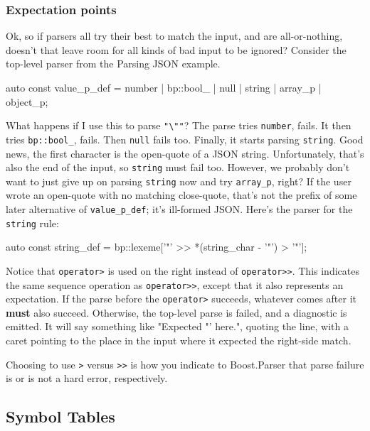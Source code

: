\subsubsection{Expectation points}

Ok, so if parsers all try their best to match the input, and are all-or-nothing, doesn't that leave room for all kinds of bad input to be ignored? Consider the top-level parser from the Parsing JSON example.

\begin{code}
auto const value_p_def =
    number | bp::bool_ | null | string | array_p | object_p;
\end{code}

What happens if I use this to parse \texttt{"\textbackslash{}""}? The parse tries \texttt{number}, fails. It then tries \texttt{bp::bool\_}, fails. Then \texttt{null} fails too. Finally, it starts parsing \texttt{string}. Good news, the first character is the open-quote of a JSON string. Unfortunately, that's also the end of the input, so \texttt{string} must fail too. However, we probably don't want to just give up on parsing \texttt{string} now and try \texttt{array\_p}, right? If the user wrote an open-quote with no matching close-quote, that's not the prefix of some later alternative of \texttt{value\_p\_def}; it's ill-formed JSON. Here's the parser for the \texttt{string} rule:

\begin{code}
auto const string_def = bp::lexeme['"' >> *(string_char - '"') > '"'];
\end{code}

Notice that \texttt{operator>} is used on the right instead of \texttt{operator>>}. This indicates the same sequence operation as \texttt{operator>>}, except that it also represents an expectation. If the parse before the \texttt{operator>} succeeds, whatever comes after it \textbf{must} also succeed. Otherwise, the top-level parse is failed, and a diagnostic is emitted. It will say something like "Expected \textquotesingle"' here.", quoting the line, with a caret pointing to the place in the input where it expected the right-side match.

Choosing to use \texttt{>} versus \texttt{>>} is how you indicate to Boost.Parser that parse failure is or is not a hard error, respectively.

\subsection{Symbol Tables}

